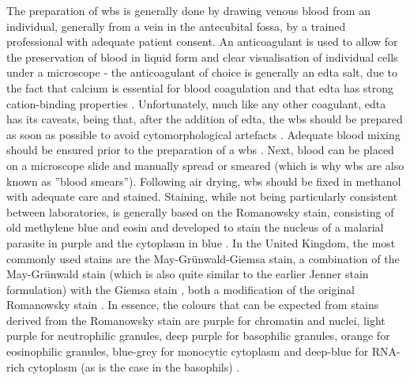 The preparation of \ac{wbs} is generally done by drawing venous blood from an individual, generally from a vein in the antecubital fossa, by a trained professional with adequate patient consent. An anticoagulant is used to allow for the preservation of blood in liquid form and clear visualisation of individual cells under a microscope - the anticoagulant of choice is generally an \ac{edta} salt, due to the fact that calcium is essential for blood coagulation and that \ac{edta} has strong cation-binding properties \cite{Oh2007-yr}. Unfortunately, much like any other coagulant, \ac{edta} has its caveats, being that, after the addition of \ac{edta}, the \ac{wbs} should be prepared as soon as possible to avoid cytomorphological artefacts \cite{Oh2007-yr,Bain2014-oc}. Adequate blood mixing should be ensured prior to the preparation of a \ac{wbs} \cite{Ashenden2012-eu}. Next, blood can be placed on a microscope slide and manually spread or smeared (which is why \ac{wbs} are also known as ”blood smears”). Following air drying, \ac{wbs} should be fixed in methanol with adequate care \cite{Bain2014-oc} and stained. Staining, while not being particularly consistent between laboratories, is generally based on the Romanowsky stain, consisting of old methylene blue and eosin and developed to stain the nucleus of a malarial parasite in purple and the cytoplasm in blue \cite{England1976-ff}. In the United Kingdom, the most commonly used stains are the May-Grünwald-Giemsa stain, a combination of the May-Grünwald stain (which is also quite similar to the earlier Jenner stain formulation) \cite{Krafts2011-xh} with the Giemsa stain \cite{Giemsa1904-dm}, both a modification of the original Romanowsky stain \cite{Bain2014-oc}. In essence, the colours that can be expected from stains derived from the Romanowsky stain are purple for chromatin and nuclei, light purple for neutrophilic granules, deep purple for basophilic granules, orange for eosinophilic granules, blue-grey for monocytic cytoplasm and deep-blue for RNA-rich cytoplasm (as is the case in the basophils) \cite{Bain2014-oc}.

